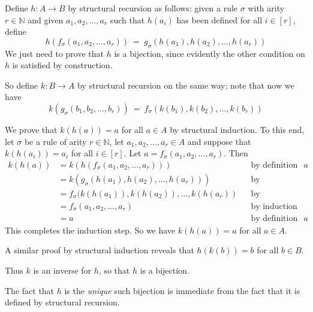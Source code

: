\begin{cproof}
Define $h : A \to B$ by structural recursion as follows: given a rule $\sigma$ with arity $r \in \mathbb{N}$ and given $a_1,a_2,\dots,a_r$ such that $h(a_i)$ has been defined for all $i \in [r]$, define
\[ h(f_{\sigma}(a_1,a_2,\dots,a_r)) ~=~ g_{\sigma}(h(a_1),h(a_2),\dots,h(a_r)) \]
We just need to prove that $h$ is a bijection, since evidently the other condition on $h$ is satisfied by construction.

So define $k : B \to A$ by structural recursion on the same way; note that now we have
\[ k(g_{\sigma}(b_1,b_2,\dots,b_r)) ~=~ f_{\sigma}(k(b_1),k(b_2),\dots,k(b_r)) \]

We prove that $k(h(a)) = a$ for all $a \in A$ by structural induction. To this end, let $\sigma$ be a rule of arity $r \in \mathbb{N}$, let $a_1,a_2,\dots,a_r \in A$ and suppose that $k(h(a_i)) = a_i$ for all $i \in [r]$. Let $a = f_{\sigma}(a_1,a_2,\dots,a_r)$. Then
\begin{align*}
k(h(a))
&= k(h(f_{\sigma}(a_1,a_2,\dots,a_r))) && \text{by definition of $a$} \\
&= k(g_{\sigma}(h(a_1),h(a_2),\dots,h(a_r))) && \text{by construction} \\
&= f_{\sigma}(k(h(a_1)),k(h(a_2)),\dots,k(h(a_r)) && \text{by construction} \\
&= f_{\sigma}(a_1,a_2,\dots,a_r) && \text{by induction hypothesis} \\
&= a && \text{by definition of $a$}
\end{align*}
This completes the induction step. So we have $k(h(a)) = a$ for all $a \in A$.

A similar proof by structural induction reveals that $h(k(b)) = b$ for all $b \in B$.

Thus $k$ is an inverse for $h$, so that $h$ is a bijection.

The fact that $h$ is the \textit{unique} such bijection is immediate from the fact that it is defined by structural recursion.
\end{cproof}

